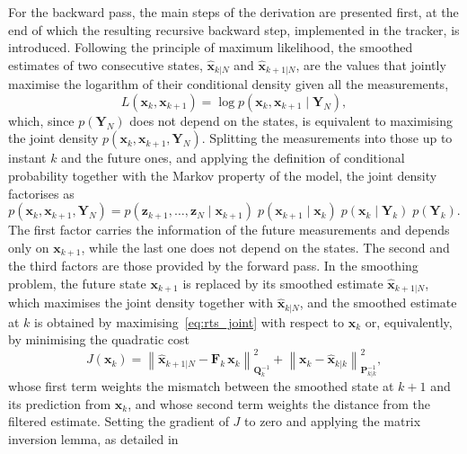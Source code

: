 For the backward pass, the main steps of the derivation are presented first, at the end of
which the resulting recursive backward step, implemented in the tracker, is introduced.
Following the principle of maximum likelihood, the smoothed estimates of two consecutive
states, $\hat{\mathbf{x}}_{k|N}$ and $\hat{\mathbf{x}}_{k+1|N}$, are the values that jointly
maximise the logarithm of their conditional density given all the measurements,
\begin{equation}
    L(\mathbf{x}_k, \mathbf{x}_{k+1}) = \log p(\mathbf{x}_k, \mathbf{x}_{k+1} \mid \mathbf{Y}_N),
    \label{eq:rts_L}
\end{equation}
which, since $p(\mathbf{Y}_N)$ does not depend on the states, is equivalent to maximising the
joint density $p(\mathbf{x}_k, \mathbf{x}_{k+1}, \mathbf{Y}_N)$. Splitting the measurements
into those up to instant $k$ and the future ones, and applying the definition of conditional
probability together with the Markov property of the model, the joint density factorises as
\begin{equation}
    p(\mathbf{x}_k, \mathbf{x}_{k+1}, \mathbf{Y}_N) =
    p(\mathbf{z}_{k+1}, \dots, \mathbf{z}_N \mid \mathbf{x}_{k+1})\;
    p(\mathbf{x}_{k+1} \mid \mathbf{x}_k)\;
    p(\mathbf{x}_k \mid \mathbf{Y}_k)\;
    p(\mathbf{Y}_k).
    \label{eq:rts_joint}
\end{equation}
The first factor carries the information of the future measurements and depends only on
$\mathbf{x}_{k+1}$, while the last one does not depend on the states. The second and the
third factors are those provided by the forward pass. In the smoothing problem, the
future state $\mathbf{x}_{k+1}$ is replaced by its smoothed estimate
$\hat{\mathbf{x}}_{k+1|N}$, which maximises the joint density together with
$\hat{\mathbf{x}}_{k|N}$, and the smoothed estimate at $k$ is obtained by
maximising~\eqref{eq:rts_joint} with respect to $\mathbf{x}_k$ or, equivalently, by
minimising the quadratic cost
\begin{equation}
    J(\mathbf{x}_k) =
    \left\|\hat{\mathbf{x}}_{k+1|N} - \mathbf{F}_k\,\mathbf{x}_k\right\|^2_{\mathbf{Q}_k^{-1}}
    + \left\|\mathbf{x}_k - \hat{\mathbf{x}}_{k|k}\right\|^2_{\mathbf{P}_{k|k}^{-1}},
    \label{eq:rts_cost}
\end{equation}
whose first term weights the mismatch between the smoothed state at $k+1$ and its prediction
from $\mathbf{x}_k$, and whose second term weights the distance from the filtered estimate.
Setting the gradient of $J$ to zero and applying the matrix inversion lemma, as detailed in
